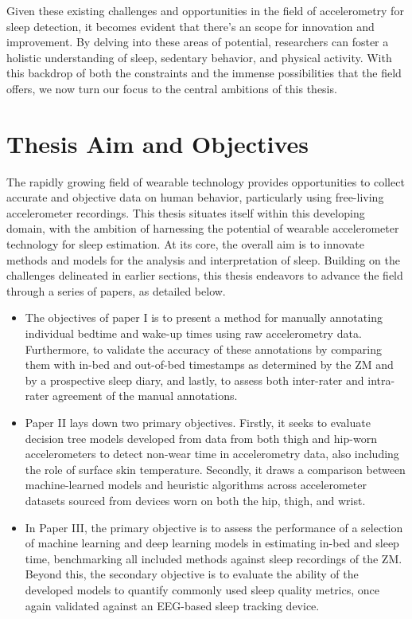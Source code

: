 \documentclass[
  10pt,
]{scrbook}
\begin{document}
Given these existing challenges and opportunities in the field of
accelerometry for sleep detection, it becomes evident that there's an
scope for innovation and improvement. By delving into these areas of
potential, researchers can foster a holistic understanding of sleep,
sedentary behavior, and physical activity. With this backdrop of both
the constraints and the immense possibilities that the field offers, we
now turn our focus to the central ambitions of this thesis.

\hypertarget{thesis-aim-and-objectives}{%
\chapter{Thesis Aim and Objectives}\label{thesis-aim-and-objectives}}

The rapidly growing field of wearable technology provides opportunities
to collect accurate and objective data on human behavior, particularly
using free-living accelerometer recordings. This thesis situates itself
within this developing domain, with the ambition of harnessing the
potential of wearable accelerometer technology for sleep estimation. At
its core, the overall aim is to innovate methods and models for the
analysis and interpretation of sleep. Building on the challenges
delineated in earlier sections, this thesis endeavors to advance the
field through a series of papers, as detailed below.

\begin{itemize}
\item
  The objectives of paper I is to present a method for manually
  annotating individual bedtime and wake-up times using raw
  accelerometry data. Furthermore, to validate the accuracy of these
  annotations by comparing them with in-bed and out-of-bed timestamps as
  determined by the ZM and by a prospective sleep diary, and lastly, to
  assess both inter-rater and intra-rater agreement of the manual
  annotations.
\item
  Paper II lays down two primary objectives. Firstly, it seeks to
  evaluate decision tree models developed from data from both thigh and
  hip-worn accelerometers to detect non-wear time in accelerometry data,
  also including the role of surface skin temperature. Secondly, it
  draws a comparison between machine-learned models and heuristic
  algorithms across accelerometer datasets sourced from devices worn on
  both the hip, thigh, and wrist.
\item
  In Paper III, the primary objective is to assess the performance of a
  selection of machine learning and deep learning models in estimating
  in-bed and sleep time, benchmarking all included methods against sleep
  recordings of the ZM. Beyond this, the secondary objective is to
  evaluate the ability of the developed models to quantify commonly used
  sleep quality metrics, once again validated against an EEG-based sleep
  tracking device.
\end{itemize}
\end{document}
